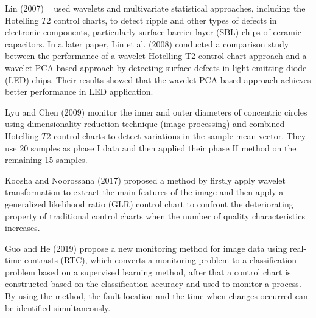 Lin (2007) ~\nocite{lin2007automated} used wavelets and multivariate statistical approaches, including the Hotelling $T2$ control charts, to detect ripple and other types of defects in electronic components, particularly surface barrier layer (SBL) chips of ceramic capacitors. In a
later paper, Lin et al. (2008)\nocite{lin2008principal} conducted a comparison study between the performance of a wavelet-Hotelling T2
control chart approach and a wavelet-PCA-based approach
by detecting surface defects in light-emitting diode (LED) chips. Their results showed that the wavelet-PCA based approach achieves better performance in LED application.

Lyu and Chen (2009) \nocite{lyu2009automated} monitor the inner and outer diameters of concentric circles using dimensionality reduction technique (image processing) and combined Hotelling $T2$ control charts to detect variations in the sample mean vector. They use 20 samples as phase I data and then applied their phase II method on the remaining 15 samples.

Koosha and Noorossana (2017)\nocite{koosha2017statistical} proposed a method by firstly apply wavelet transformation to extract the main features of the image and then apply a generalized likelihood ratio (GLR) control chart to confront the deteriorating property of traditional control charts when the number of quality characteristics increases.


Guo and He (2019) \nocite{guo2019real}propose a new monitoring method for image data using real-time contrasts (RTC), which converts a monitoring problem to a classification problem based on a supervised learning method, after that a control chart is constructed based on the classification accuracy and used to monitor a process. By using the method, the fault location and the time when changes occurred can be identified simultaneously.
























 